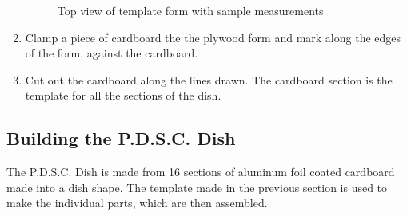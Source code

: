 \documentclass{article}
\begin{document}
\begin{enumerate}
\begin{figure}[!htb]
                      \caption{Top view of template form with sample measurements}\label{fig:awesome_image3}
                    \endminipage
                \end{figure}
                \item Clamp a piece of cardboard the the plywood form and mark along the edges of the form, against the cardboard.
                \item Cut out the cardboard along the lines drawn. The cardboard section is the template for all the sections of the dish.

            \end{enumerate}
            
        \subsection{Building the P.D.S.C. Dish}
            The P.D.S.C. Dish is made from 16 sections of aluminum foil coated cardboard made into a dish shape. The template made in the previous 
            section is used to make the individual parts, which are then assembled.
\end{document}
